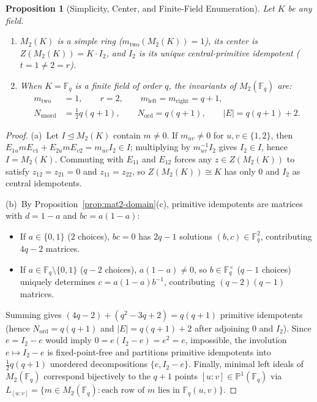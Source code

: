 \documentclass[11pt]{article}
\newtheorem{proposition}[theorem]{Proposition}
\theoremstyle{definition}
\newcommand{\Mat}{M}
\newcommand{\F}{\mathbb{F}}
\begin{document}
\begin{proposition}[Simplicity, Center, and Finite-Field Enumeration]
\label{prop:mat2-field}
Let $K$ be any field.
\begin{enumerate}
\item[(a)] $\Mat_2(K)$ is a simple ring ($m_{\mathrm{two}}(\Mat_2(K)) = 1$), its
center is $Z(\Mat_2(K)) = K \cdot I_2$, and $I_2$ is its unique central-primitive
idempotent ($t = 1 \neq 2 = r$).
\item[(b)] When $K = \F_q$ is a finite field of order $q$, the invariants of
$\Mat_2(\F_q)$ are:
\[
\begin{aligned}
  m_{\mathrm{two}} &= 1, \qquad r = 2, \qquad m_{\mathrm{left}} = m_{\mathrm{right}} = q+1,\\
  N_{\mathrm{unord}} &= \tfrac{1}{2}q(q+1), \qquad N_{\mathrm{ord}} = q(q+1), \qquad
  |E| = q(q+1)+2.
\end{aligned}
\]
\end{enumerate}
\end{proposition}

\begin{proof}
(a)~Let $I \trianglelefteq \Mat_2(K)$ contain $m \neq 0$. If $m_{uv} \neq 0$ for
$u, v \in \{1,2\}$, then $E_{1u} m E_{v1} + E_{2u} m E_{v2} = m_{uv} I_2 \in I$;
multiplying by $m_{uv}^{-1} I_2$ gives $I_2 \in I$, hence $I = \Mat_2(K)$.
Commuting with $E_{11}$ and $E_{12}$ forces any $z \in Z(\Mat_2(K))$ to satisfy
$z_{12} = z_{21} = 0$ and $z_{11} = z_{22}$, so $Z(\Mat_2(K)) \cong K$ has only
$0$ and $I_2$ as central idempotents.

(b)~By Proposition~\ref{prop:mat2-domain}(c), primitive idempotents are matrices
with $d = 1 - a$ and $bc = a(1-a)$:
\begin{itemize}
\item If $a \in \{0, 1\}$ ($2$ choices), $bc = 0$ has $2q - 1$ solutions
$(b,c) \in \F_q^2$, contributing $4q - 2$ matrices.
\item If $a \in \F_q \setminus \{0, 1\}$ ($q - 2$ choices), $a(1-a) \neq 0$, so
$b \in \F_q^\times$ ($q - 1$ choices) uniquely determines $c = a(1-a)b^{-1}$,
contributing $(q-2)(q-1)$ matrices.
\end{itemize}
Summing gives $(4q-2) + (q^2 - 3q + 2) = q(q+1)$ primitive idempotents (hence
$N_{\mathrm{ord}} = q(q+1)$ and $|E| = q(q+1) + 2$ after adjoining $0$ and $I_2$).
Since $e = I_2 - e$ would imply $0 = e(I_2 - e) = e^2 = e$, impossible, the
involution $e \mapsto I_2 - e$ is fixed-point-free and partitions primitive
idempotents into $\frac{1}{2}q(q+1)$ unordered decompositions $\{e, I_2 - e\}$.
Finally, minimal left ideals of $\Mat_2(\F_q)$ correspond bijectively to the
$q + 1$ points $[u : v] \in \mathbb{P}^1(\F_q)$ via
$L_{[u:v]} = \{m \in \Mat_2(\F_q) : \text{each row of } m \text{ lies in } \F_q(u,v)\}$.
\end{proof}
\end{document}
